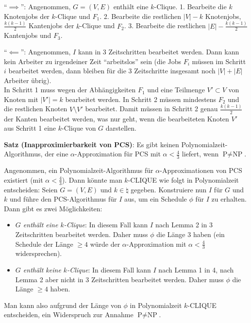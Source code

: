 \begin{Beweis}
    "`$\implies$"':
    Angenommen, $G = (V, E)$ enthält eine $k$-Clique.
    1. Bearbeite die $k$ Knotenjobs der $k$-Clique und $F_1$.
    2. Bearbeite die restlichen $|V| - k$ Knotenjobs, $\frac{k(k-1)}{2}$ Kantenjobs der $k$-Clique
    und $F_2$.
    3. Bearbeite die restlichen $|E| - \frac{k(k-1)}{2}$ Kantenjobs und $F_3$.

    "`$\impliedby$"':
    Angenommen, $I$ kann in 3 Zeitschritten bearbeitet werden.
    Dann kann kein Arbeiter zu irgendeiner Zeit "`arbeitslos"' sein
    (die Jobs $F_i$ müssen im Schritt $i$ bearbeitet werden,
    dann bleiben für die 3 Zeitschritte insgesamt noch $|V| + |E|$ Arbeiter übrig).\\
    In Schritt 1 muss wegen der Abhängigkeiten
    $F_1$ und eine Teilmenge $V' \subset V$ von Knoten mit $|V'| = k$ bearbeitet werden.
    In Schritt 2 müssen mindestens $F_2$ und die restlichen Knoten $V \setminus V'$ bearbeitet.
    Damit müssen in Schritt 2 genau $\frac{k(k-1)}{2}$ der Kanten bearbeitet werden,
    was nur geht, wenn die bearbeiteten Knoten $V'$ aus Schritt 1 eine $k$-Clique von $G$
    darstellen.
\end{Beweis}

\linie

\textbf{Satz (Inapproximierbarkeit von PCS)}:
Es gibt keinen Polynomialzeit-Algorithmus,
der eine $\alpha$-Approximation für PCS mit $\alpha < \frac{4}{3}$ liefert,
wenn $\text{P} \not= \text{NP}$.

\begin{Beweis}
    Angenommen, ein Polynomialzeit-Algorithmus für $\alpha$-Approximationen von PCS existiert
    (mit $\alpha < \frac{4}{3}$).
    Dann könnte man $k$-CLIQUE wie folgt in Polynomialzeit entscheiden:
    Seien $G = (V, E)$ und $k \in \natural$ gegeben.
    Konstruiere nun $I$ für $G$ und $k$ und führe den PCS-Algorithmus für $I$ aus,
    um ein Schedule $\phi$ für $I$ zu erhalten.
    Dann gibt es zwei Möglichkeiten:
    \begin{itemize}
        \item
        \emph{$G$ enthält eine $k$-Clique}:
        In diesem Fall kann $I$ nach Lemma 2 in 3 Zeitschritten bearbeitet werden.
        Daher muss $\phi$ die Länge $3$ haben
        (ein Schedule der Länge $\ge 4$ würde der $\alpha$-Approximation mit $\alpha < \frac{4}{3}$
        widersprechen).

        \item
        \emph{$G$ enthält keine $k$-Clique}:
        In diesem Fall kann $I$ nach Lemma 1 in 4,
        nach Lemma 2 aber nicht in 3 Zeitschritten bearbeitet werden.
        Daher muss $\phi$ die Länge $\ge 4$ haben.
    \end{itemize}
    Man kann also aufgrund der Länge von $\phi$ in Polynomialzeit $k$-CLIQUE entscheiden,
    ein Widerspruch zur Annahme $\text{P} \not= \text{NP}$.
\end{Beweis}

